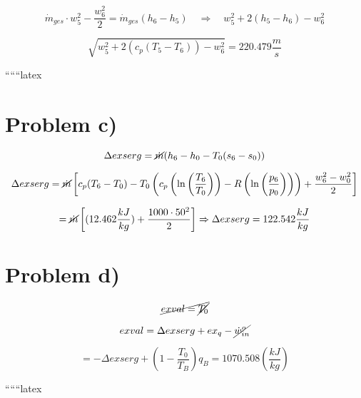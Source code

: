 \[
\dot{m}_{ges} \cdot w_5^2 - \frac{w_6^2}{2} = \dot{m}_{ges} (h_6 - h_5) \quad \Rightarrow \quad w_5^2 + 2 (h_5 - h_6) - w_6^2
\]

\[
\sqrt{w_5^2 + 2 (c_p (T_5 - T_6)) - w_6^2} = 220.479 \frac{m}{s}
\]

``````latex


\section*{Problem c)}

\[
\Delta exserg = \cancel{\dot{m}} (h_6 - h_0 - T_0 (s_6 - s_0))
\]

\[
\Delta exserg = \cancel{\dot{m}} \left[ c_p (T_6 - T_0) - T_0 \left( c_p \left( \ln \left( \frac{T_6}{T_0} \right) \right) - R \left( \ln \left( \frac{p_6}{p_0} \right) \right) \right) + \frac{w_6^2 - w_0^2}{2} \right]
\]

\[
= \cancel{\dot{m}} \left[ (12.462 \frac{kJ}{kg}) + \frac{1000 \cdot 50^2}{2} \right] \Rightarrow \Delta exserg = 122.542 \frac{kJ}{kg}
\]

\section*{Problem d)}

\[
\cancel{exval = \cancel{T_0}}
\]

\[
exval = \Delta exserg + ex_q - \cancel{\dot{w}_{in}^o}
\]

\[
= -\Delta exserg + \left( 1 - \frac{T_0}{T_B} \right) q_B = 1070.508 \left( \frac{kJ}{kg} \right)
\]

``````latex


